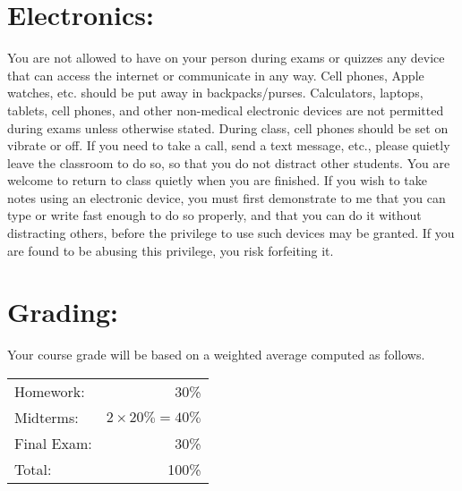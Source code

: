 \documentclass[margin]{res}
\theoremstyle{plain}
\theoremstyle{definition}
\theoremstyle{remark}
\newcounter{week}
\begin{document}
\begin{resume}

\section{Electronics: } You are not allowed to have on your person during exams or quizzes any device that can access the internet or communicate in any way.  Cell phones, Apple watches, etc. should be put away in backpacks/purses.  Calculators, laptops, tablets, cell phones, and other non-medical electronic devices are not permitted during exams unless otherwise stated.  During class, cell phones should be set on vibrate or off.  If you need to take a call, send a text message, etc., please quietly leave the classroom to do so, so that you do not distract other students.  You are welcome to return to class quietly when you are finished.  If you wish to take notes using an electronic device, you must first demonstrate to me that you can type or write fast enough to do so properly, and that you can do it without distracting others, before the privilege to use such devices may be granted.  If you are found to be abusing this privilege, you risk forfeiting it.

\pagebreak

\section{Grading:}
Your course grade will be based on a weighted average computed as follows.
\begin{center}
\begin{tabular}{| l  r  |}\hline
Homework:   & 30\%                 \\
Midterms:   & $2\times20\% = 40\%$ \\
Final Exam: & 30\%                 \\
Total:      & 100\%                \\ \hline
\end{tabular}
\end{center}


\end{resume}
\end{document}
